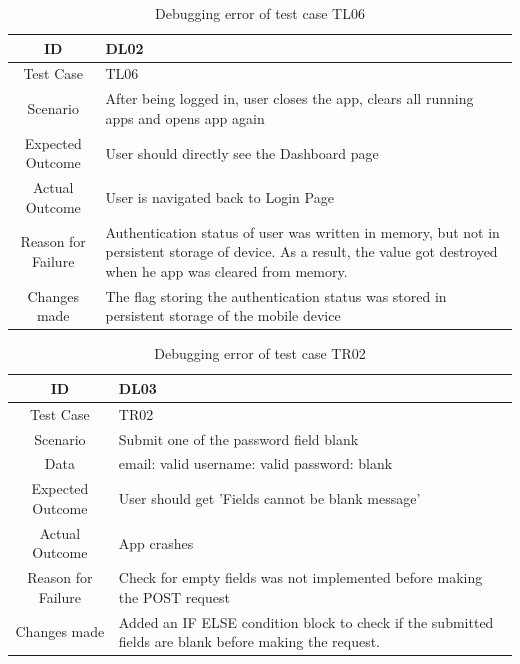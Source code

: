 \documentclass[12pt, a4paper, oneside]{article}
\begin{document}
\begin{table}[H]
\begin{tabularx}{\linewidth}{|c|X|}
\hline
\rowcolor[HTML]{C0C0C0} 
ID                 & DL02                                                                       \\ \hline
Test Case          & TL06                                                                       \\ \hline
Scenario           & After being logged in, user closes the app, clears all running apps and opens app again \\ \hline
Expected Outcome   & User should directly see the Dashboard page                                       \\ \hline
Actual Outcome     & User is navigated back to Login Page                                          \\ \hline
Reason for Failure & Authentication status of user was written in memory, but not in persistent storage of device. As a result, the value got destroyed when he app was cleared from memory.                                    \\ \hline
Changes made       & The flag storing the authentication status was stored in persistent storage of the mobile device                       \\ \hline                  
\end{tabularx}
\caption{Debugging error of test case TL06}
\end{table}


\begin{table}[H]
\begin{tabularx}{\linewidth}{|c|X|}
\hline
\rowcolor[HTML]{C0C0C0} 
ID                 & DL03                                                                       \\ \hline
Test Case          & TR02                                                                       \\ \hline
Scenario           & Submit one of the password field blank \\ \hline
Data & email: valid \newline username: valid \newline password: blank \\ \hline
Expected Outcome   &  User should get 'Fields cannot be blank message'                                        \\ \hline
Actual Outcome     & App crashes                                           \\ \hline
Reason for Failure & Check for empty fields was not implemented before making the POST request                                    \\ \hline
Changes made       & Added an IF ELSE condition block to check if the submitted fields are blank before making the request.                       \\ \hline                  
\end{tabularx}
\caption{Debugging error of test case TR02}
\end{table}
\end{document}

